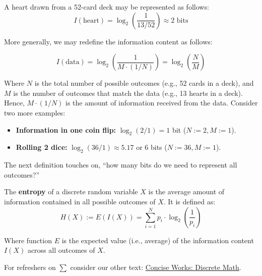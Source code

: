 \newpage 

\begin{Example}

    \label{ex:card_info_content}

    A heart drawn from a 52-card deck may be represented as follows:
    \[I(\text{heart}) = \log_2\left(\dfrac{1}{13/52}\right) \approx 2 \text{ bits}\]

    \noindent
    More generally, we may redefine the information content as follows:

    \[
        I(\text{data}) = \log_2\left(\dfrac{1}{M \cdot (1/N)}\right) = \log_2 \left(\dfrac{N}{M}\right)
    \]

    \noindent
    Where $N$ is the total number of possible outcomes (e.g., 52 cards in a deck), and $M$ is the number of outcomes that match 
    the data (e.g., 13 hearts in a deck). Hence, $M\cdot (1/N)$ is the amount of information received from the data. Consider two more examples:
    \begin{itemize}
        \item \textbf{Information in one coin flip:} $\log_2\left(2/1\right) = 1$ bit ($N:=2, M:=1$).
        \item \textbf{Rolling 2 dice:} $\log_2\left(36/1\right) \approx 5.17$ or 6 bits ($N:=36, M:=1$).
    \end{itemize}
\end{Example}

\noindent
The next definition touches on, ``how many bits do we need to represent all outcomes?'' 
\begin{Def}[Entropy]

    \label{def:entropy}

    The \textbf{entropy} of a discrete random variable $X$ is the average amount of information contained in all possible outcomes of $X$.
    It is defined as:
    \Large
    \[
    H(X) := E(I(X)) = \sum_{i=1}^{N} p_i \cdot \log_2\left(\dfrac{1}{p_i}\right)
    \]

    \normalsize
    \noindent
    Where function $E$ is the expected value (i.e., average) of the information content $I(X)$ across all outcomes of $X$.
\end{Def}

\begin{Tip} For refreshers on $\sum$ consider our other text:
    \href{https://github.com/Concise-Works/Discrete-Math}{Concise Works: Discrete Math}.
\end{Tip}

\newpage 



\newpage 



